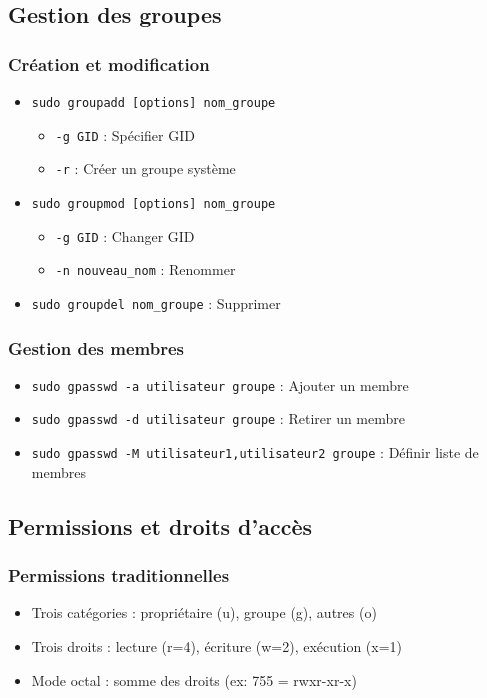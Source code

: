 \documentclass[12pt,a4paper]{article}
\begin{document}
\subsection{Gestion des groupes}

\subsubsection{Création et modification}
\begin{itemize}
    \item \texttt{sudo groupadd [options] nom\_groupe}
    \begin{itemize}
        \item \texttt{-g GID} : Spécifier GID
        \item \texttt{-r} : Créer un groupe système
    \end{itemize}
    \item \texttt{sudo groupmod [options] nom\_groupe}
    \begin{itemize}
        \item \texttt{-g GID} : Changer GID
        \item \texttt{-n nouveau\_nom} : Renommer
    \end{itemize}
    \item \texttt{sudo groupdel nom\_groupe} : Supprimer
\end{itemize}

\subsubsection{Gestion des membres}
\begin{itemize}
    \item \texttt{sudo gpasswd -a utilisateur groupe} : Ajouter un membre
    \item \texttt{sudo gpasswd -d utilisateur groupe} : Retirer un membre
    \item \texttt{sudo gpasswd -M utilisateur1,utilisateur2 groupe} : Définir liste de membres
\end{itemize}

\subsection{Permissions et droits d'accès}

\subsubsection{Permissions traditionnelles}
\begin{itemize}
    \item Trois catégories : propriétaire (u), groupe (g), autres (o)
    \item Trois droits : lecture (r=4), écriture (w=2), exécution (x=1)
    \item Mode octal : somme des droits (ex: 755 = rwxr-xr-x)
\end{itemize}
\end{document}
